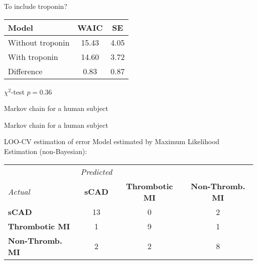 \documentclass[xcolor=dvipsnames]{beamer}
\begin{document}
\begin{frame}{To include troponin?}
	\vspace{-10.5pt}
	\begin{center}
		\begin{tabular}{lcc}
			\hline
			Model & WAIC  & SE \\
			\hline
			Without troponin & 15.43 & 4.05 \\ 
			With troponin & 14.60 & 3.72 \\
			Difference & 0.83 & 0.87 \\
			\hline
		\end{tabular}
		
		$\chi^2$-test $p=0.36$
	\end{center}
\end{frame}

\begin{frame}{Markov chain for a human subject}
	\vspace{-5pt}
	\begin{center}
	\end{center}
\end{frame}

\begin{frame}{Markov chain for a human subject}
	\vspace{-7pt}
	\begin{center}
	\end{center}
\end{frame}

\begin{frame}{LOO-CV estimation of error}
	\vspace{-15pt}
	Model estimated by Maximum Likelihood Estimation (non-Bayesian):
	\vspace{4ex}
	
	\begin{tabular}{l|ccc}
		& \emph{Predicted} & & \\
		\emph{Actual}  & \textbf{sCAD} & \textbf{Thrombotic MI} & \textbf{Non-Thromb. MI} \\
		\hline
		\textbf{sCAD} & 13 &  0 & 2\\
		\textbf{Thrombotic MI} &   1 & 9 &  1\\
		\textbf{Non-Thromb. MI}  & 2  & 2 & 8 
	\end{tabular}
\end{frame}
\end{document}
